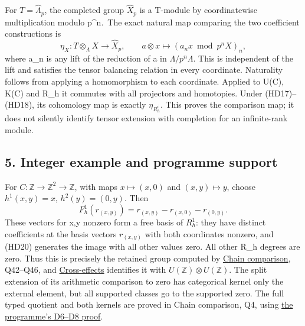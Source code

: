 \documentclass[
]{article}
\begin{document}
For \(T=\widehat\Lambda_p\), the completed group \(\widehat X_p\) is a
T-module by coordinatewise multiplication modulo p\^{}n.~The exact
natural map comparing the two coefficient constructions is \[
\eta_X:T\otimes_\Lambda X\longrightarrow\widehat X_p,
\qquad a\otimes x\longmapsto(a_nx\bmod p^nX)_n,
\tag{HD19}
\] where a\_n is any lift of the reduction of a in
\(\Lambda/p^n\Lambda\). This is independent of the lift and satisfies
the tensor balancing relation in every coordinate. Naturality follows
from applying a homomorphism to each coordinate. Applied to U(C), K(C)
and R\_h it commutes with all projectors and homotopies. Under
(HD17)--(HD18), its cohomology map is exactly \(\eta_{R_h^i}\). This
proves the comparison map; it does not silently identify tensor
extension with completion for an infinite-rank module.

\subsection{5. Integer example and programme
support}\label{integer-example-and-programme-support}

For \(C:\mathbb Z\to\mathbb Z^2\to\mathbb Z\), with maps
\(x\mapsto(x,0)\) and \((x,y)\mapsto y\), choose \(h^1(x,y)=x\),
\(h^2(y)=(0,y)\). Then \[
F_h^1(r_{(x,y)})=r_{(x,y)}-r_{(x,0)}-r_{(0,y)}.
\tag{HD20}
\] These vectors for x,y nonzero form a free basis of \(R_h^1\): they
have distinct coefficients at the basis vectors \(r_{(x,y)}\) with both
coordinates nonzero, and (HD20) generates the image with all other
values zero. All other R\_h degrees are zero. Thus this is precisely the
retained group computed by
\href{https://github.com/KokunoYumeto/zeta-function-research-reader/blob/6af54ea3c8ef99127af327f3103e086c68d482c2/workbenches/splitzero-tandem/branches/identity-absorber-square/CHAIN_COMPARISON.md}{Chain
comparison}, Q42--Q46, and
\href{https://github.com/KokunoYumeto/zeta-function-research-reader/blob/6af54ea3c8ef99127af327f3103e086c68d482c2/workbenches/splitzero-tandem/branches/identity-absorber-square/CROSS_EFFECTS.md}{Cross-effects}
identifies it with \(U(\mathbb Z)\otimes U(\mathbb Z)\). The split
extension of its arithmetic comparison to zero has categorical kernel
only the external element, but all supported classes go to the supported
zero. The full typed quotient and both kernels are proved in Chain
comparison, Q4, using
\href{https://github.com/KokunoYumeto/zeta-function-research-reader/blob/39ced92952a9c807d51500783b221beb141da3b6/workbenches/splitzero-tandem/tex/support_diagrams.tex\#L125}{the
programme's D6--D8 proof}.
\end{document}
